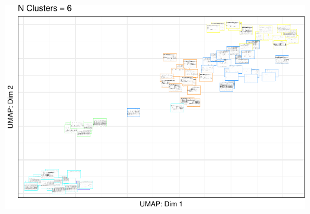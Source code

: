 \documentclass[
]{book}
\begin{document}
\includegraphics{gibbonR_tutorial_files/figure-latex/unnamed-chunk-15-1.pdf}

  
\end{document}
